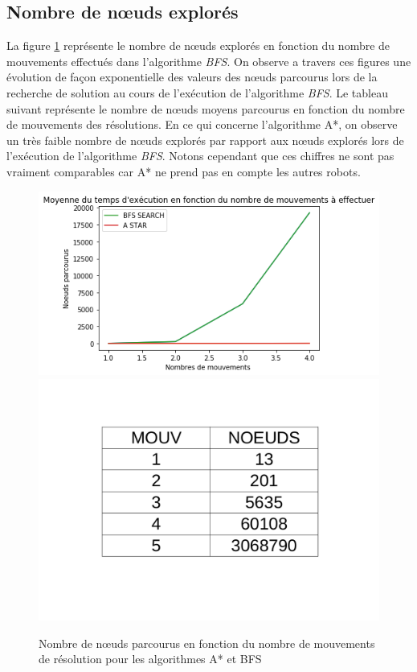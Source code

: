 \documentclass[a4paper]{article} %
\begin{document}
	\subsection{Nombre de nœuds explorés}
La figure \ref{explores} représente le nombre de nœuds explorés en fonction du nombre de mouvements effectués dans l'algorithme \textsl{BFS}. On observe a travers ces figures une évolution de façon exponentielle des valeurs des nœuds parcourus lors de la recherche de solution au cours de l’exécution de l'algorithme \textsl{BFS}. Le tableau suivant représente le nombre de nœuds moyens parcourus en fonction du nombre de mouvements des résolutions. En ce qui concerne l'algorithme A*, on observe un très faible nombre de nœuds explorés par rapport aux nœuds explorés lors de l’exécution de l'algorithme \textsl{BFS}. Notons cependant que ces chiffres ne sont pas vraiment comparables car A* ne prend pas en compte les autres robots.

\begin{figure}[htpb]
	\centering
	\includegraphics[scale=0.4]{./images/node.png}
	\includegraphics[scale=0.15]{./images/tabBFS.png}
	\caption{Nombre de nœuds parcourus en fonction du  nombre de mouvements de résolution pour les algorithmes A* et BFS }\label{explores}
\end{figure}
\end{document}
